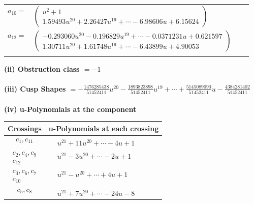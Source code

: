 \documentclass[1p]{elsarticle_modified}
\theoremstyle{definition}
\begin{document}
\begin{tabular}{m{7pt} m{180pt} m{7pt} m{180pt} }
\flushright $a_{10}=$&$\begin{pmatrix}u^2+1\\1.59493 u^{20}+2.26427 u^{19}+\cdots-6.98606 u+6.15624\end{pmatrix}$ \\
\flushright $a_{12}=$&$\begin{pmatrix}-0.293060 u^{20}-0.196829 u^{19}+\cdots-0.0371231 u+0.621597\\1.30711 u^{20}+1.61748 u^{19}+\cdots-6.43899 u+4.90053\end{pmatrix}$\\&\end{tabular}
\flushleft \textbf{(ii) Obstruction class $= -1$}\\~\\
\flushleft \textbf{(iii) Cusp Shapes $= -\frac{1476285438}{51452411} u^{20}-\frac{1893823898}{51452411} u^{19}+\cdots+\frac{5145089090}{51452411} u-\frac{4384281402}{51452411}$}\\~\\
\newpage\renewcommand{\arraystretch}{1}
\flushleft \textbf{(iv) u-Polynomials at the component}\newline \\
\begin{tabular}{m{50pt}|m{274pt}}
Crossings & \hspace{64pt}u-Polynomials at each crossing \\
\hline $$\begin{aligned}c_{1},c_{11}\end{aligned}$$&$\begin{aligned}
&u^{21}+11 u^{20}+\cdots-4 u+1
\end{aligned}$\\
\hline $$\begin{aligned}c_{2},c_{4},c_{9}\\c_{12}\end{aligned}$$&$\begin{aligned}
&u^{21}-3 u^{20}+\cdots-2 u+1
\end{aligned}$\\
\hline $$\begin{aligned}c_{3},c_{6},c_{7}\\c_{10}\end{aligned}$$&$\begin{aligned}
&u^{21}- u^{20}+\cdots+4 u+1
\end{aligned}$\\
\hline $$\begin{aligned}c_{5},c_{8}\end{aligned}$$&$\begin{aligned}
&u^{21}+7 u^{20}+\cdots-24 u-8
\end{aligned}$\\
\hline
\end{tabular}\\~\\
\end{document}
